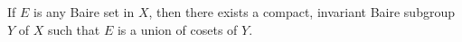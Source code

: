 If $E$ is any Baire set in $X$, then there exists a compact, invariant Baire subgroup $Y$ of $X$ such that $E$ is a union of cosets of $Y$.